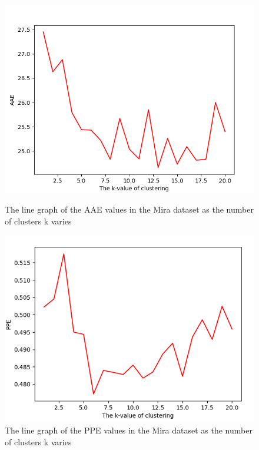 \documentclass[conference,compsoc]{IEEEtran}
\begin{document}
\begin{figure}[H]
	\begin{minipage}[t]{0.45\linewidth}
		\includegraphics[width=\linewidth]{AAEInMira.png} 
		\caption{The line graph of the AAE values in the Mira dataset as the number of clusters k varies} 
		\label{Fig:AAEInMira}
	\end{minipage}%
	\hfill%
	\begin{minipage}[t]{0.45\linewidth}
		\includegraphics[width=\linewidth]{PPEInMira.png}
		\caption{The line graph of the PPE values in the Mira dataset as the number of clusters k varies}
		\label{Fig:PPEInMira}
	\end{minipage} 
\end{figure}
\end{document}
